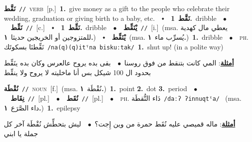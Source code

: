 \documentclass[10pt,a4paper,twoside]{article} %
\begin{document}
\begin{multicols}{2}
{\setlength\topsep{0pt}\textbf{\foreignlanguage{arabic}{نَقَّط}}\ {\color{gray}\texttt{//}\color{black}}\ \textsc{verb}\ [p.]\ \textbf{1.}~give money as a gift to the people who celebrate their wedding, graduation or giving birth to a baby, etc.\ \ $\smblkdiamond$\ \ \setlength\topsep{0pt}\textbf{\foreignlanguage{arabic}{نَقَّط}}\ \textbf{1.}~dribble\ \ $\bullet$\ \ \setlength\topsep{0pt}\textbf{\foreignlanguage{arabic}{نَقِّط}}\ {\color{gray}\texttt{//}\color{black}}\ [c.]\ \ $\smblkdiamond$\ \ \setlength\topsep{0pt}\textbf{\foreignlanguage{arabic}{نَقِّط}}\ \textbf{1.}~dribble\ \ $\bullet$\ \ \setlength\topsep{0pt}\textbf{\foreignlanguage{arabic}{يْنَقِّط}}\ {\color{gray}\texttt{//}\color{black}}\ [i.]\ \color{gray}(msa. \foreignlanguage{arabic}{يعطي مال كهدية للمتزوجين أو الخريجين حديثا}~\foreignlanguage{arabic}{\textbf{١.}})\color{black}\ \ $\smblkdiamond$\ \ \setlength\topsep{0pt}\textbf{\foreignlanguage{arabic}{يْنَقِّط}}\ \color{gray}(msa. \foreignlanguage{arabic}{يُسرِّب ماء}~\foreignlanguage{arabic}{\textbf{١.}})\color{black}\ \textbf{1.}~dribble\ \ $\bullet$\ \ \textsc{ph.} \color{gray} \foreignlanguage{arabic}{نَقِّطنَا بسكوتَك}\color{black}\ {\color{gray}\texttt{/{\sffamily na(q)(q)itˤna biskuːtak}/}\color{black}}\ \textbf{1.}~shut up! (in a polite way)\  \begin{flushright}\color{gray}\foreignlanguage{arabic}{\textbf{\underline{\foreignlanguage{arabic}{أمثلة}}}: المي كانت بتنقط من فوق روسنا\ $\bullet$\ \  بقى بده يروح عالعرس وكان بده ينَقِّط بحدود ال 100 شيكل بس أنا ماخليته لا يروح ولا ينقِّط}\end{flushright}\color{black}} \vspace{2mm}

{\setlength\topsep{0pt}\textbf{\foreignlanguage{arabic}{نُقْطَة}}\ {\color{gray}\texttt{//}\color{black}}\ \textsc{noun}\ [f.]\ \color{gray}(msa. \foreignlanguage{arabic}{نُقْطَة}~\foreignlanguage{arabic}{\textbf{١.}})\color{black}\ \textbf{1.}~point  \textbf{2.}~dot  \textbf{3.}~period\ \ $\bullet$\ \ \setlength\topsep{0pt}\textbf{\foreignlanguage{arabic}{نِقَاط}}\ {\color{gray}\texttt{//}\color{black}}\ [pl.]\ \ $\bullet$\ \ \setlength\topsep{0pt}\textbf{\foreignlanguage{arabic}{نُقَط}}\ {\color{gray}\texttt{//}\color{black}}\ [pl.]\ \ $\bullet$\ \ \textsc{ph.} \color{gray} \foreignlanguage{arabic}{دَاء النُّقطَة}\color{black}\ {\color{gray}\texttt{/{\sffamily daːʔ ʔinnuqtˤa}/}\color{black}}\ \color{gray} (msa. \foreignlanguage{arabic}{داء الصَّرَع}~\foreignlanguage{arabic}{\textbf{١.}})\color{black}\ \textbf{1.}~epilepsy\  \begin{flushright}\color{gray}\foreignlanguage{arabic}{\textbf{\underline{\foreignlanguage{arabic}{أمثلة}}}: ماله قميصي عليه نُقَط حمرة من وين إِجت؟\ $\bullet$\ \  ليش بتحطِّش نُقْطَة آخر كل جملة يا ابني}\end{flushright}\color{black}} \vspace{2mm}


\end{multicols}
\end{document}
